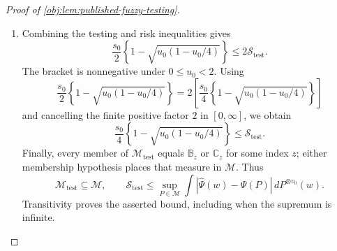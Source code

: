 \begin{proof}[Proof of \cref{obj:lem:published-fuzzy-testing}]
\begin{enumerate}
Integrating these inequalities under the component product laws gives
\[
\begin{aligned}
\frac{s_0}{2}\mathbb B_z^{\otimes v_0}(\mathcal A_{\mathrm{test}})
&\le\mathcal R_{\mathrm{test}}(\mathbb B_z)
\le\mathcal S_{\mathrm{test}},\\
\frac{s_0}{2}\mathbb C_z^{\otimes v_0}(\mathcal A_{\mathrm{test}}^c)
&\le\mathcal R_{\mathrm{test}}(\mathbb C_z)
\le\mathcal S_{\mathrm{test}}.
\end{aligned}
\]
Kernel event probabilities are measurable functions of the index. Integrating
their bounds against the probability prior therefore gives
\[
\begin{aligned}
\frac{s_0}{2}\mathbb B_{\mathrm{mix}}(\mathcal A_{\mathrm{test}})
&=\int\frac{s_0}{2}
  \mathbb B_z^{\otimes v_0}(\mathcal A_{\mathrm{test}})\,d\omega(z)
\le\int\mathcal S_{\mathrm{test}}\,d\omega
=\mathcal S_{\mathrm{test}},\\
\frac{s_0}{2}\mathbb C_{\mathrm{mix}}(\mathcal A_{\mathrm{test}}^c)
&=\int\frac{s_0}{2}
  \mathbb C_z^{\otimes v_0}(\mathcal A_{\mathrm{test}}^c)\,d\omega(z)
\le\int\mathcal S_{\mathrm{test}}\,d\omega
=\mathcal S_{\mathrm{test}}.
\end{aligned}
\]
Adding yields the extended nonnegative inequality
\[
\frac{s_0}{2}
\left\{
\mathbb B_{\mathrm{mix}}(\mathcal A_{\mathrm{test}})
+\mathbb C_{\mathrm{mix}}(\mathcal A_{\mathrm{test}}^c)
\right\}
\le2\mathcal S_{\mathrm{test}}.
\]

\item Combining the testing and risk inequalities gives
\[
\frac{s_0}{2}\left\{1-\sqrt{u_0(1-u_0/4)}\right\}
\le2\mathcal S_{\mathrm{test}}.
\]
The bracket is nonnegative under \(0\le u_0<2\). Using
\[
\frac{s_0}{2}\left\{1-\sqrt{u_0(1-u_0/4)}\right\}
=
2\left[
\frac{s_0}{4}\left\{1-\sqrt{u_0(1-u_0/4)}\right\}
\right]
\]
and cancelling the finite positive factor \(2\) in \([0,\infty]\), we obtain
\[
\frac{s_0}{4}\left\{1-\sqrt{u_0(1-u_0/4)}\right\}
\le\mathcal S_{\mathrm{test}}.
\]
Finally, every member of \(\mathcal M_{\mathrm{test}}\) equals
\(\mathbb B_z\) or \(\mathbb C_z\) for some index \(z\); either membership
hypothesis places that measure in \(\mathcal M\). Thus
\[
\mathcal M_{\mathrm{test}}\subseteq\mathcal M,
\qquad
\mathcal S_{\mathrm{test}}
\le
\sup_{P\in\mathcal M}
\int|\widehat\Psi(w)-\Psi(P)|\,dP^{\otimes v_0}(w).
\]
Transitivity proves the asserted bound, including when the supremum is infinite.
\end{enumerate}
\end{proof}
